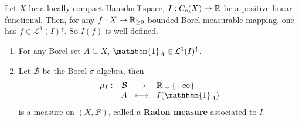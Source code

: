 \begin{remark}
    Let $X$ be a locally compact Hausdorff space,
    $I : C_c(X) \rightarrow \mathbb{R}$ be a positive linear functional.
    Then, for any $f : X \rightarrow \mathbb{R}_{\ge 0}$ bounded Borel measurable mapping,
    one has $f \in \mathcal{L}^1(I)^\uparrow$.
    So $I(f)$ is well defined.
    \begin{enumerate}
        \item For any Borel set $A \subseteq X$, $\mathbbm{1}_{A} \in \mathcal{L}^1(I)^\uparrow$.
        \item Let $\mathcal{B}$  be the Borel $\sigma$-algebra, then 
            $$\begin{array}{rrcl}
                \mu_{I} : & \mathcal{B} & \rightarrow & \RR \cup \{+\infty\} \\
                & A & \longmapsto & I(\mathbbm{1}_{A})
            \end{array}$$
            is a measure on $(X,\mathcal{B})$, called a \textbf{Radon measure} associated to $I$.
    \end{enumerate}
\end{remark}

